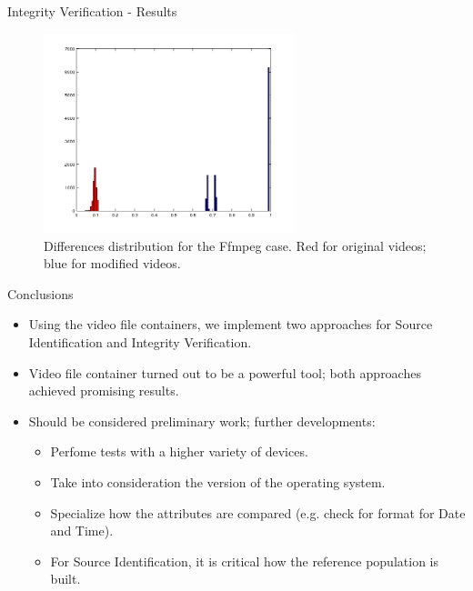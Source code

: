 \begin{tframe}{Integrity Verification - Results}

\begin{figure}
\centering
    \includegraphics[width=0.65\textwidth]{images/ffmpeg-hist.png}
    \caption{Differences distribution for the Ffmpeg case. Red for original videos; blue for modified videos.}
\end{figure}
\end{tframe}



\begin{tframe}{Conclusions}

\begin{itemize}
\item Using the video file containers, we implement two approaches for Source Identification and Integrity Verification.
\vspace{0.1cm}
\item Video file container turned out to be a powerful tool; both approaches achieved promising results.
\vspace{0.1cm}
\item Should be considered preliminary work; further developments:
\begin{itemize}
\vspace{0.1cm}
\item Perfome tests with a higher variety of devices.
\vspace{0.1cm}
\item Take into consideration the version of the operating system.
\vspace{0.1cm}
\item Specialize how the attributes are compared (e.g. check for format for Date and Time).
\vspace{0.1cm}
\item For Source Identification, it is critical how the reference population is built.
\end{itemize}
\end{itemize}
\end{tframe}
